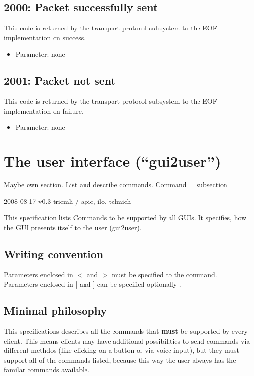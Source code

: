 \documentclass[12pt,a4paper]{book}
\begin{document}
\subsection{2000: Packet successfully sent}
This code is returned by the transport protocol subsystem to the
EOF implementation on success.
\begin{itemize}
\item Parameter: none
\end{itemize}
\subsection{2001: Packet not sent}
This code is returned by the transport protocol subsystem to the
EOF implementation on failure.
\begin{itemize}
\item Parameter: none
\end{itemize}
\section{The user interface ("`gui2user"')}
Maybe own section.
List and describe commands.
Command = subsection

2008-08-17 v0.3-triemli / apic, ilo, telmich

This specification lists Commands to be supported by all GUIs. It
specifies, how the GUI presents itself to the user (gui2user).

\subsection{Writing convention}
Parameters enclosed in $<$ and $>$ must be specified to the command.
Parameters enclosed in $[$ and $]$ can be specified optionally .

\subsection{Minimal philosophy}
This specifications describes all the commands that \textbf{must} be
supported by every client. This means clients may have additional possibilities
to send commands via different methdos (like clicking on a button or via
voice input), but they must support all of the commands listed, because this
way the user always has the familar commands available.
\end{document}

